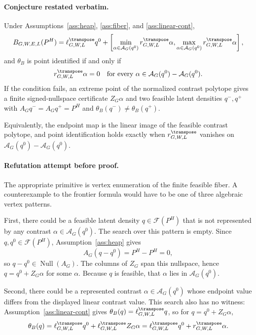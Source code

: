 \begin{theorem}\label{thm:frontier}
\paragraph{Conjecture restated verbatim.}
Under Assumptions~\ref{ass:heap}, \ref{ass:fiber}, and \ref{ass:linear-cont},
\[
B_{G,W,E,L}(P^H)=
\ell_{G,W,L}^{\transpose}q^0+
\left[
\min_{\alpha\in\mathcal{A}_G(q^0)} r_{G,W,L}^{\transpose}\alpha,
\max_{\alpha\in\mathcal{A}_G(q^0)} r_{G,W,L}^{\transpose}\alpha
\right],
\]
and \(\theta_B\) is point identified if and only if
\[
r_{G,W,L}^{\transpose}\alpha=0
\quad\text{for every }\alpha\in\mathcal{A}_G(q^0)-\mathcal{A}_G(q^0).
\]
If the condition fails, an extreme point of the normalized contrast polytope gives a finite signed-nullspace certificate \(Z_G\alpha\) and two feasible latent densities \(q^-,q^+\) with \(A_Gq^-=A_Gq^+=P^H\) and \(\theta_B(q^-)\neq\theta_B(q^+)\).

Equivalently, the endpoint map is the linear image of the feasible contrast polytope, and point identification holds exactly when \(r_{G,W,L}^{\transpose}\) vanishes on \(\mathcal{A}_G(q^0)-\mathcal{A}_G(q^0)\).
\end{theorem}

\paragraph{Refutation attempt before proof.}
The appropriate primitive is vertex enumeration of the finite feasible fiber.  A counterexample to the frontier formula would have to be one of three algebraic vertex patterns.

First, there could be a feasible latent density \(q\in\mathcal{F}(P^H)\) that is not represented by any contrast \(\alpha\in\mathcal{A}_G(q^0)\).  The search over this pattern is empty.  Since \(q,q^0\in\mathcal{F}(P^H)\), Assumption~\ref{ass:heap} gives
\[
A_G(q-q^0)=P^H-P^H=0,
\]
so \(q-q^0\in\operatorname{Null}(A_G)\).  The columns of \(Z_G\) span this nullspace, hence \(q=q^0+Z_G\alpha\) for some \(\alpha\).  Because \(q\) is feasible, that \(\alpha\) lies in \(\mathcal{A}_G(q^0)\).

Second, there could be a represented contrast \(\alpha\in\mathcal{A}_G(q^0)\) whose endpoint value differs from the displayed linear contrast value.  This search also has no witness: Assumption~\ref{ass:linear-cont} gives \(\theta_B(q)=\ell_{G,W,L}^{\transpose}q\), so for \(q=q^0+Z_G\alpha\),
\[
\theta_B(q)=\ell_{G,W,L}^{\transpose}q^0+
\ell_{G,W,L}^{\transpose}Z_G\alpha
=\ell_{G,W,L}^{\transpose}q^0+r_{G,W,L}^{\transpose}\alpha .
\]

